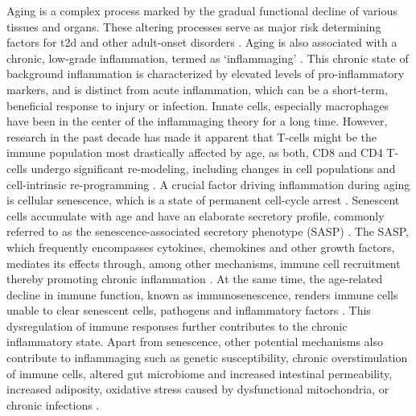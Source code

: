 Aging is a complex process marked by the gradual functional decline of various tissues and organs. These altering processes serve as major risk determining factors for \gls{t2d} and other adult-onset disorders \textbf{\cite{sandovici_ageing_2016,tuduri_pancreatic_2022}}. Aging is also associated with a chronic, low-grade inflammation, termed as `inflammaging' \textbf{\cite{frasca_aging_2017,franceschi_inflamm-aging_2000}}. This chronic state of background inflammation is characterized by elevated levels of pro-inflammatory markers, and is distinct from acute inflammation, which can be a short-term, beneficial response to injury or infection. Innate cells, especially macrophages have been in the center of the inflammaging theory for a long time. However, research in the past decade has made it apparent that T-cells might be the immune population most drastically affected by age, as both, CD8 and CD4 T-cells undergo significant re-modeling, including changes in cell populations and cell-intrinsic re-programming \textbf{\cite{https://www.sciencedirect.com/science/article/pii/S1044532323001094}}. A crucial factor driving inflammation during aging is cellular senescence, which is a state of permanent cell-cycle arrest \textbf{\cite{ren_inflammatory_2009}}. Senescent cells accumulate with age and have an elaborate secretory profile, commonly referred to as the senescence-associated secretory phenotype (SASP) \textbf{\cite{gorgoulis_cellular_2019}}. The SASP, which frequently encompasses cytokines, chemokines and other growth factors, mediates its effects through, among other mechanisms, immune cell recruitment thereby promoting chronic inflammation \textbf{\cite{gorgoulis_cellular_2019}}. At the same time, the age-related decline in immune function, known as immunosenescence, renders immune cells unable to clear senescent cells, pathogens and inflammatory factors \textbf{\cite{sanada_source_2018}}. This dysregulation of immune responses further contributes to the chronic inflammatory state.  Apart from senescence, other potential mechanisms also contribute to inflammaging such as genetic susceptibility, chronic overstimulation of immune cells, altered gut microbiome and increased intestinal permeability, increased adiposity, oxidative stress caused by dysfunctional mitochondria, or chronic infections \textbf{\cite{frasca_aging_2017,ferrucci_inflammageing_2018,frasca_inflammaging_2016}}.\\






